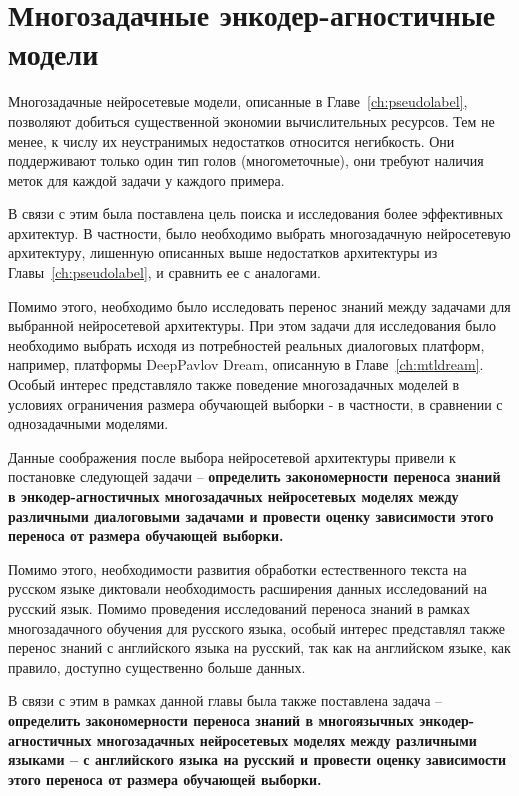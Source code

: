\chapter{Многозадачные энкодер-агностичные модели}\label{ch:tr-ag}
Многозадачные нейросетевые модели, описанные в Главе~\ref{ch:pseudolabel}, позволяют добиться существенной экономии вычислительных ресурсов. Тем не менее, к числу их неустранимых недостатков относится негибкость. Они поддерживают только один тип голов (многометочные), они требуют наличия меток для каждой задачи у каждого примера.

В связи с этим была поставлена цель поиска и исследования более эффективных архитектур. В частности, было необходимо выбрать многозадачную нейросетевую архитектуру, лишенную описанных выше недостатков архитектуры из Главы~\ref{ch:pseudolabel}, и сравнить ее с аналогами.

Помимо этого, необходимо было исследовать перенос знаний между задачами для выбранной нейросетевой архитектуры. При этом задачи для исследования было необходимо выбрать исходя из потребностей реальных диалоговых платформ, например, платформы DeepPavlov Dream, описанную в Главе~\ref{ch:mtldream}. Особый интерес представляло также поведение многозадачных моделей в условиях ограничения размера обучающей выборки - в частности, в сравнении с однозадачными моделями.

Данные соображения после выбора нейросетевой архитектуры привели к постановке следующей задачи -- \textbf{определить закономерности переноса знаний в энкодер-агностичных многозадачных нейросетевых моделях между различными диалоговыми задачами и провести оценку зависимости этого переноса от размера обучающей выборки.}

Помимо этого, необходимости развития обработки естественного текста на русском языке диктовали необходимость расширения данных исследований на русский язык. Помимо проведения исследований переноса знаний в рамках многозадачного обучения для русского языка, особый интерес представлял также перенос знаний с английского языка на русский, так как на английском языке, как правило, доступно существенно больше данных. 

В связи с этим в рамках данной главы была также поставлена задача -- \textbf{определить закономерности переноса знаний в многоязычных энкодер-агностичных многозадачных нейросетевых моделях между различными языками -- с английского языка на русский и провести оценку зависимости этого переноса от размера обучающей выборки.}


